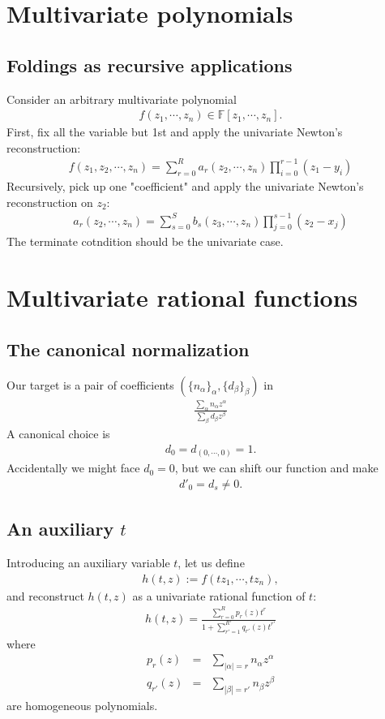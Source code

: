 \documentclass[11pt]{book}
\begin{document}
\section{Multivariate polynomials}

\subsection{Foldings as recursive applications}
Consider an arbitrary multivariate polynomial
\begin{eqnarray}
f(z_1,\cdots, z_n) \in \mathbb{F}[z_1,\cdots, z_n].
\end{eqnarray}
First, fix all the variable but 1st and apply the univariate Newton's reconstruction:
\begin{eqnarray}
f(z_1, z_2, \cdots, z_n) = \sum_{r=0}^R a_r (z_2,\cdots, z_n) \prod_{i=0}^{r-1}(z_1 - y_i)
\end{eqnarray}
Recursively, pick up one "coefficient" and apply the univariate Newton's reconstruction on $z_2$:
\begin{eqnarray}
a_r(z_2, \cdots, z_n) = \sum_{s=0}^{S} b_s (z_3,\cdots, z_n) \prod_{j=0}^{s-1}(z_2 - x_j)
\end{eqnarray}
The terminate cotndition should be the univariate case.

\section{Multivariate rational functions}
\subsection{The canonical normalization}
Our target is a pair of coefficients $(\{ n_\alpha\}_\alpha, \{ d_\beta\}_\beta)$ in
\begin{eqnarray}
\frac{\sum_\alpha n_\alpha z^\alpha}{\sum_\beta d_\beta z^\beta}
\end{eqnarray}
A canonical choice is
\begin{eqnarray}
d_0 = d_{(0,\cdots,0)} = 1.
\end{eqnarray}
Accidentally we might face $d_0 = 0$, but we can shift our function and make
\begin{eqnarray}
d'_0 = d_{s} \neq 0.
\end{eqnarray}

\subsection{An auxiliary $t$}
Introducing an auxiliary variable $t$, let us define
\begin{eqnarray}
h(t,z) := f(tz_1, \cdots, tz_n),
\end{eqnarray}
and reconstruct $h(t,z)$ as a univariate rational function of $t$:
\begin{eqnarray}
h(t,z) = \frac{\sum_{r=0}^R p_r(z) t^r}{1+ \sum_{r'=1}^{R'} q_{r'}(z) t^{r'}}
\end{eqnarray}
where
\begin{eqnarray}
p_r(z) &=& \sum_{|\alpha| = r} n_\alpha z^\alpha \\
q_{r'}(z) &=& \sum_{|\beta| = r'} n_\beta z^\beta
\end{eqnarray}
are homogeneous polynomials.
\end{document}
